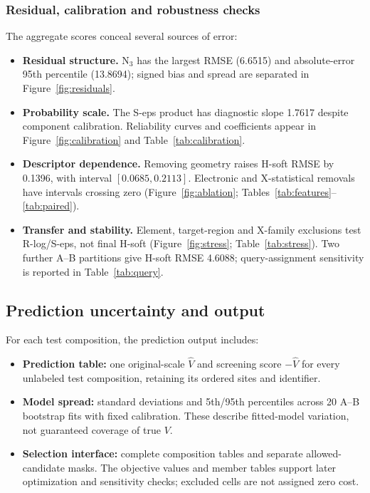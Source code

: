 \subsubsection{Residual, calibration and robustness checks}
The aggregate scores conceal several sources of error:
\begin{itemize}
  \item \textbf{Residual structure.} $\mathrm{N_3}$ has the largest RMSE (6.6515) and absolute-error 95th percentile (13.8694); signed bias and spread are separated in Figure~\ref{fig:residuals}.
  \item \textbf{Probability scale.} The S-eps product has diagnostic slope 1.7617 despite component calibration. Reliability curves and coefficients appear in Figure~\ref{fig:calibration} and Table~\ref{tab:calibration}.
  \item \textbf{Descriptor dependence.} Removing geometry raises H-soft RMSE by 0.1396, with interval $[0.0685,0.2113]$. Electronic and X-statistical removals have intervals crossing zero (Figure~\ref{fig:ablation}; Tables~\ref{tab:features}--\ref{tab:paired}).
  \item \textbf{Transfer and stability.} Element, target-region and X-family exclusions test R-log/S-eps, not final H-soft (Figure~\ref{fig:stress}; Table~\ref{tab:stress}). Two further A--B partitions give H-soft RMSE 4.6088; query-assignment sensitivity is reported in Table~\ref{tab:query}.
\end{itemize}
\FloatBarrier

\subsection{Prediction uncertainty and output}
For each test composition, the prediction output includes:
\begin{itemize}
  \item \textbf{Prediction table:} one original-scale $\widehat V$ and screening score $-\widehat V$ for every unlabeled test composition, retaining its ordered sites and identifier.
  \item \textbf{Model spread:} standard deviations and 5th/95th percentiles across 20 A--B bootstrap fits with fixed calibration. These describe fitted-model variation, not guaranteed coverage of true $V$.
  \item \textbf{Selection interface:} complete composition tables and separate allowed-candidate masks. The objective values and member tables support later optimization and sensitivity checks; excluded cells are not assigned zero cost.
\end{itemize}

